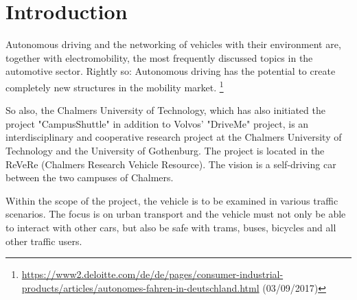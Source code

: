 \chapter{Introduction}


Autonomous driving and the networking of vehicles with their environment are, together with electromobility, the most frequently discussed topics in the automotive sector.
Rightly so: Autonomous driving has the potential to create completely new structures in the mobility market.
\footnote{\url{https://www2.deloitte.com/de/de/pages/consumer-industrial-products/articles/autonomes-fahren-in-deutschland.html} (03/09/2017)}

So also, the Chalmers University of Technology, which has also initiated the project "CampusShuttle" in addition to Volvos' "DriveMe" project, 
is an interdisciplinary and cooperative research project at the Chalmers University of Technology and the University of Gothenburg.
The project is located in the ReVeRe (Chalmers Research Vehicle Resource). The vision is a self-driving car between the two campuses of Chalmers.

Within the scope of the project, the vehicle is to be examined in various traffic scenarios. The focus is on urban transport and the vehicle must not only be able to interact with other cars, 
but also be safe with trams, buses, bicycles and all other traffic users.

